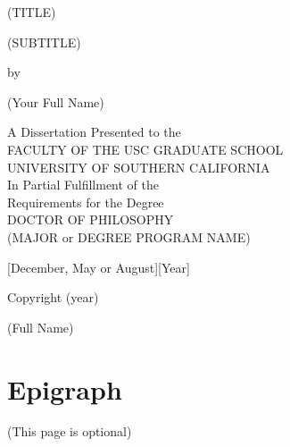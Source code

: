 \documentclass[oneside,11pt,letterpaper]{article}
\begin{document}
	\begin{titlepage}
		\begin{center}
			\vspace*{2.5cm}
			
			\Huge
			(TITLE)
			
			\Large
			(SUBTITLE)
			
			\vspace{1cm}
			
			by 
			
			\vspace{1cm}
			
			(Your Full Name)
			
			\vspace{4cm}
			\normalsize
			A Dissertation Presented to the \\
			FACULTY OF THE USC GRADUATE SCHOOL \\
			UNIVERSITY OF SOUTHERN CALIFORNIA \\
			In Partial Fulfillment of the \\
			Requirements for the Degree \\
			DOCTOR OF PHILOSOPHY \\
			(MAJOR or DEGREE PROGRAM NAME)
			
			\vspace{2cm}
			
			[December, May or August][Year]
	\end{center}
	\vspace*{\fill}
	\begin{minipage}[t]{0.48\textwidth}
		Copyright (year)\\
	\end{minipage}
	\hfill
	\begin{minipage}[t]{0.48\textwidth}
		\begin{flushright}
			(Full Name)\\
		\end{flushright}
	\end{minipage}
	
	\end{titlepage}

	\section*{Epigraph} %
		\begin{center}
				(This page is optional)
		\end{center}
		\newpage
	
\end{document}
